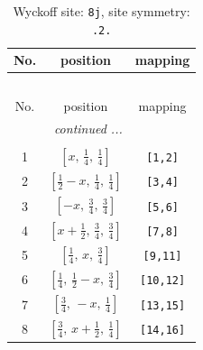 \documentclass[fleqn,8pt]{jsarticle}
\begin{document}
\begin{longtable}{ccc}
\caption{Wyckoff site: {\tt 8j}, site symmetry: {\tt .2.}}
 \\
 \hline \hline
No. & position & mapping \\ \hline \endfirsthead

\multicolumn{2}{l}{\tablename\ \thetable{}} \\
 \hline \hline
No. & position & mapping \\ \hline \endhead

 \hline \hline
\multicolumn{2}{r}{\footnotesize\it continued ...} \\ \endfoot

 \hline \hline
\multicolumn{2}{r}{} \\ \endlastfoot

1 & $\left[ x,\, \frac{1}{4},\, \frac{1}{4} \right]$ & {\tt [1,2]} \\ \hline
2 & $\left[ \frac{1}{2} - x,\, \frac{1}{4},\, \frac{1}{4} \right]$ & {\tt [3,4]} \\ \hline
3 & $\left[ - x,\, \frac{3}{4},\, \frac{3}{4} \right]$ & {\tt [5,6]} \\ \hline
4 & $\left[ x + \frac{1}{2},\, \frac{3}{4},\, \frac{3}{4} \right]$ & {\tt [7,8]} \\ \hline
5 & $\left[ \frac{1}{4},\, x,\, \frac{3}{4} \right]$ & {\tt [9,11]} \\ \hline
6 & $\left[ \frac{1}{4},\, \frac{1}{2} - x,\, \frac{3}{4} \right]$ & {\tt [10,12]} \\ \hline
7 & $\left[ \frac{3}{4},\, - x,\, \frac{1}{4} \right]$ & {\tt [13,15]} \\ \hline
8 & $\left[ \frac{3}{4},\, x + \frac{1}{2},\, \frac{1}{4} \right]$ & {\tt [14,16]} \\
\end{longtable}
\renewcommand{\arraystretch}{1.2}
\end{document}
